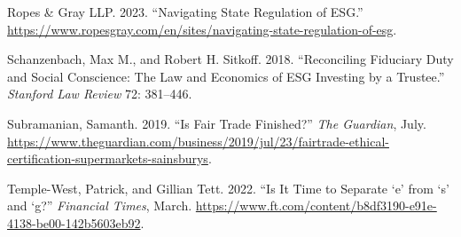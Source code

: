 \documentclass[
  12pt,
]{article}
\newlength{\cslhangindent}
\newlength{\cslentryspacingunit} %
\newenvironment{CSLReferences}[2] %
 {%
  \setlength{\parindent}{0pt}
  \ifodd #1
  \let\oldpar\par
  \def\par{\hangindent=\cslhangindent\oldpar}
  \fi
  \setlength{\parskip}{#2\cslentryspacingunit}
 }%
 {}
\begin{document}
\begin{CSLReferences}{1}{0}
\leavevmode{}%
Ropes \& Gray LLP. 2023. {``Navigating State Regulation of ESG.''} \url{https://www.ropesgray.com/en/sites/navigating-state-regulation-of-esg}.

\leavevmode{}%
Schanzenbach, Max M., and Robert H. Sitkoff. 2018. {``Reconciling Fiduciary Duty and Social Conscience: The Law and Economics of ESG Investing by a Trustee.''} \emph{Stanford Law Review} 72: 381--446.

\leavevmode{}%
Subramanian, Samanth. 2019. {``Is Fair Trade Finished?''} \emph{The Guardian}, July. \url{https://www.theguardian.com/business/2019/jul/23/fairtrade-ethical-certification-supermarkets-sainsburys}.

\leavevmode{}%
Temple-West, Patrick, and Gillian Tett. 2022. {``Is It Time to Separate {`}e{'} from {`}s{'} and {`}g?''} \emph{Financial Times}, March. \url{https://www.ft.com/content/b8df3190-e91e-4138-be00-142b5603eb92}.

\end{CSLReferences}
\end{document}
